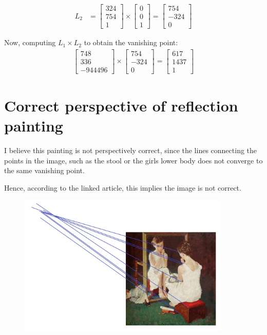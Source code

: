 \documentclass[12pt, oneside]{article}
\begin{document}
\begin{align*}
L_2 &=  
\begin{bmatrix} 324 \\ 754 \\ 1 \end{bmatrix} \times 
\begin{bmatrix} 0 \\ 0 \\ 1 \end{bmatrix}  = 
\begin{bmatrix} 754  \\ -324 \\ 0 \end{bmatrix}                                                   
\end{align*}

Now, computing $L_1 \times L_2$ to obtain the vanishing point:
\begin{align*}
    \begin{bmatrix} 748  \\ 336 \\ -944496 \end{bmatrix}
 \times 
 \begin{bmatrix} 754  \\ -324 \\ 0 \end{bmatrix}    = 
    \begin{bmatrix} 617  \\ 1437 \\ 1  \end{bmatrix}
\end{align*}

\clearpage
\section{Correct perspective of reflection painting}

I believe this painting is not perspectively correct, since the lines connecting
the points in the image, such as the stool or the girls lower body does not 
converge to the same vanishing point.

Hence, according to the linked article, this implies the image is not correct.

\begin{figure}[H]
    \includegraphics[width=0.90\textwidth]{imgs/girl_at_mirror}
  \end{figure}
\end{document}
